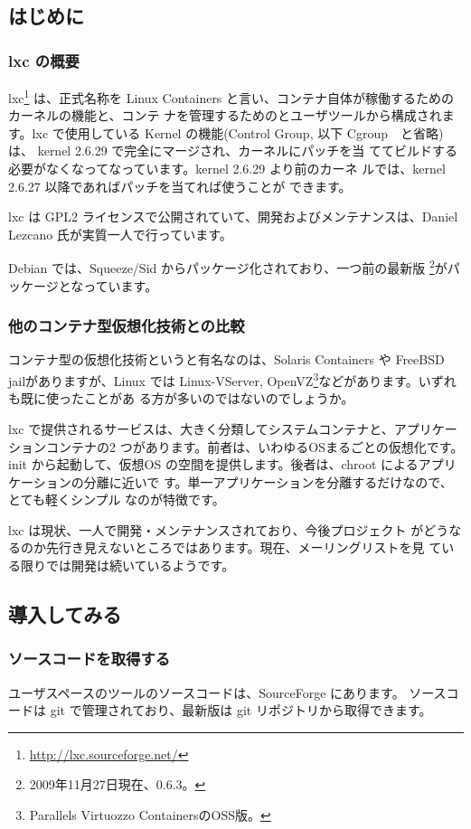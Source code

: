 \documentclass[mingoth,a4paper]{jsarticle}
\begin{document}
\subsection{はじめに}
\subsubsection{lxc の概要}
lxc\footnote{\url{http://lxc.sourceforge.net/}} は、正式名称を Linux
Containers と言い、コンテナ自体が稼働するためのカーネルの機能と、コンテ
ナを管理するためのとユーザツールから構成されます。lxc で使用している
Kernel の機能(Control Group, 以下 Cgroup　と省略)は、
kernel 2.6.29 で完全にマージされ、カーネルにパッチを当
ててビルドする必要がなくなってなっています。kernel 2.6.29 より前のカーネ
ルでは、kernel 2.6.27 以降であればパッチを当てれば使うことが
できます。

lxc は GPL2 ライセンスで公開されていて、開発およびメンテナンスは、Daniel
Lezcano 氏が実質一人で行っています。

Debian では、Squeeze/Sid からパッケージ化されており、一つ前の最新版
\footnote{2009年11月27日現在、0.6.3。}がパッケージとなっています。

\subsubsection{他のコンテナ型仮想化技術との比較}

コンテナ型の仮想化技術というと有名なのは、Solaris Containers や FreeBSD
jailがありますが、Linux では Linux-VServer, OpenVZ\footnote{Parallels
Virtuozzo ContainersのOSS版。}などがあります。いずれも既に使ったことがあ
る方が多いのではないのでしょうか。

lxc で提供されるサービスは、大きく分類してシステムコンテナと、アプリケーションコンテナの2
つがあります。前者は、いわゆるOSまるごとの仮想化です。init から起動して、仮想OS
の空間を提供します。後者は、chroot によるアプリケーションの分離に近いで
す。単一アプリケーションを分離するだけなので、とても軽くシンプル
なのが特徴です。

lxc は現状、一人で開発・メンテナンスされており、今後プロジェクト
がどうなるのか先行き見えないところではあります。現在、メーリングリストを見
ている限りでは開発は続いているようです。

\subsection{導入してみる}
\subsubsection{ソースコードを取得する}
ユーザスペースのツールのソースコードは、SourceForge にあります。
ソースコードは git で管理されており、最新版は git リポジトリから取得できます。
\end{document}
